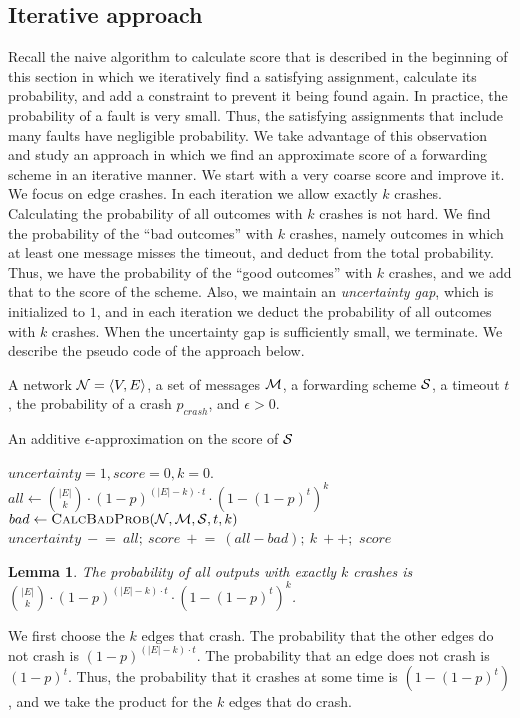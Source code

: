 \documentclass[11pt,eepic]{article}
\newcommand{\zug}[1]{\langle #1  \rangle}
\newcommand{\N}{{\cal N}}
\newcommand{\M}{{\cal M}}
\renewcommand{\S}{{\cal S}}
\newtheorem{lemma}[theorem]{Lemma}
\def\eod{\vrule height 6pt width 5pt depth 0pt}
\newenvironment{proof}{\noindent {\bf Proof:} \hspace{.677em}}
	                      {\hspace*{\fill}{\eod}}
\begin{document}
	\subsection{Iterative approach}
		\label{sec:Iterative}
		Recall the naive algorithm to calculate score that is described in the beginning of this section in which we iteratively find a satisfying assignment, calculate its probability, and add a constraint to prevent it being found again. In practice, the probability of a fault is very small. Thus, the satisfying assignments that include many faults have negligible probability. We take advantage of this observation and study an approach in which we find an approximate score of a forwarding scheme in an iterative manner. We start with a very coarse score and improve it. We focus on edge crashes. In each iteration we allow exactly $k$ crashes. Calculating the probability of all outcomes with $k$ crashes is not hard. We find the probability of the ``bad outcomes'' with $k$ crashes, namely outcomes in which at least one message misses the timeout, and deduct from the total probability. Thus, we have the probability of the ``good outcomes'' with $k$ crashes, and we add that to the score of the scheme. Also, we maintain an {\em uncertainty gap}, which is initialized to $1$, and in each iteration we deduct the probability of all outcomes with $k$ crashes. When the uncertainty gap is sufficiently small, we terminate. We describe the pseudo code of the approach below.


		\begin{center}
		\begin{algorithmic}
		\Require A network $\N=\zug{V, E}$, a set of messages $\M$, a forwarding scheme $\S$, a timeout $t$, the probability of a crash $p_{crash}$, and $\epsilon > 0$.

		\Ensure An additive $\epsilon$-approximation on the score of $\S$ 

		\State $uncertainty = 1, score=0, k=0$.
		\State $all \gets {|E| \choose k} \cdot (1-p)^{(|E|-k) \cdot t} \cdot (1 - (1-p)^t)^k$
		\State $bad \gets \Call{CalcBadProb}{\N, \M, \S, t, k}$
		\State $uncertainty \ -\!= \ all; \ score \ +\!= \  (all-bad);\ k\ +\!+;$
		\EndWhile
		\State \Return $score$
		\end{algorithmic}
		\end{center}

		\begin{lemma}
		\label{lem:calc-prob}
		The probability of all outputs with exactly $k$ crashes is ${|E| \choose k} \cdot (1-p)^{(|E|-k) \cdot t} \cdot (1 - (1-p)^t)^k$.
		\end{lemma}
		\begin{proof}
		We first choose the $k$ edges that crash. The probability that the other edges do not crash is $(1-p)^{(|E|-k) \cdot t}$. The probability that an edge does not crash is $(1-p)^t$. Thus, the probability that it crashes at some time is $(1-(1-p)^t)$, and we take the product for the $k$ edges that do crash.
		\end{proof}
\end{document}
